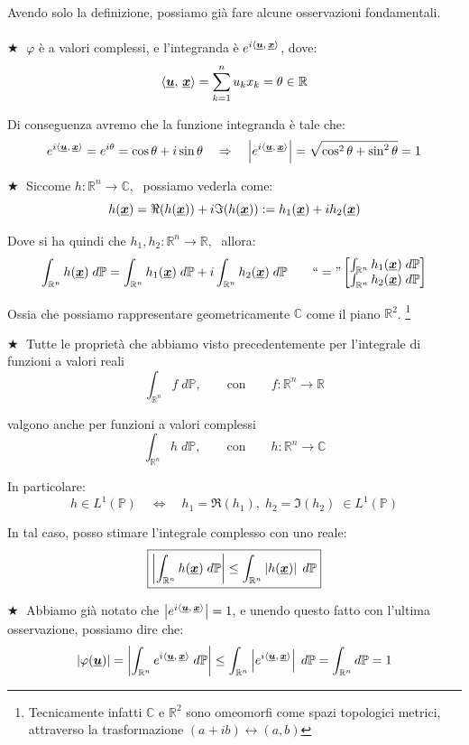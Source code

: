 \noindent Avendo solo la definizione, possiamo già fare alcune osservazioni fondamentali.\\
\\
\(\bigstar \;\) $\varphi$ è a valori complessi, e l'integranda è $e^{i\left\langle \underline{{\boldsymbol{u}}},\, \underline{{\boldsymbol{x}}} \right\rangle}$, dove:
\[\left\langle \underline{{\boldsymbol{u}}},\, \underline{{\boldsymbol{x}}} \right\rangle = \sum_{k=1}^n u_kx_k = \theta\in \mathbb{R}\]

Di conseguenza avremo che la funzione integranda è tale che:
\[e^{i\left\langle \underline{{\boldsymbol{u}}},\, \underline{{\boldsymbol{x}}} \right\rangle} = e^{i\theta} = \cos\theta+ i\sin\theta \quad \Rightarrow\quad \left|e^{i\left\langle \underline{{\boldsymbol{u}}},\, \underline{{\boldsymbol{x}}} \right\rangle}\right| = \sqrt{\cos^2\theta+ \sin^2\theta} = 1\]

\bigskip
\noindent \(\bigstar \;\) Siccome $h:\mathbb{R}^n\to\mathbb{C}, \;$ possiamo vederla come:
\[h(\underline{{\boldsymbol{x}}}) = \Re(h(\underline{{\boldsymbol{x}}}))+ i\Im(h(\underline{{\boldsymbol{x}}})):=h_1(\underline{{\boldsymbol{x}}})+ i h_2(\underline{{\boldsymbol{x}}})\]

Dove si ha quindi che $h_1, h_2:\mathbb{R}^n\to \mathbb{R}, \;$ allora:
\[\int_{\mathbb{R}^n}h(\underline{{\boldsymbol{x}}})\;d\mathbb{P} = \int_{\mathbb{R}^n}h_1(\underline{{\boldsymbol{x}}})\;d\mathbb{P}+i\int_{\mathbb{R}^n}h_2(\underline{{\boldsymbol{x}}})\;d\mathbb{P} \qquad \text{``}=\text{''} \begin{bmatrix}
    \int_{\mathbb{R}^n}h_1(\underline{{\boldsymbol{x}}})\;d\mathbb{P}\\
    \int_{\mathbb{R}^n}h_2(\underline{{\boldsymbol{x}}})\;d\mathbb{P}
\end{bmatrix}\]

Ossia che possiamo rappresentare geometricamente $\mathbb{C}$ come il piano $\mathbb{R}^2$. \footnote{Tecnicamente infatti $\mathbb{C}$ e $\mathbb{R}^2$ sono omeomorfi come spazi topologici metrici, attraverso la trasformazione $(a +ib)\leftrightarrow(a, b)$}

\bigskip
\noindent \(\bigstar \;\) Tutte le proprietà che abbiamo visto precedentemente per l'integrale di funzioni a valori reali
\[\int_{\mathbb{R}^n}f\;d\mathbb{P}, \qquad \text{con}\qquad f:\mathbb{R}^n\to \mathbb{R}\]

valgono anche per funzioni a valori complessi
\[\int_{\mathbb{R}^n}h\;d\mathbb{P}, \qquad \text{con}\qquad h:\mathbb{R}^n\to \mathbb{C}\]

In particolare:
\[h\in L^1(\mathbb{P})\quad \iff \quad h_1 = \Re(h_1), \;h_2 = \Im(h_2) \;\in L^1(\mathbb{P})\]

In tal caso, posso stimare l'integrale complesso con uno reale:
\[\boxed{\left|\int_{\mathbb{R}^n}h(\underline{{\boldsymbol{x}}})\;d\mathbb{P}\right|\leq \int_{\mathbb{R}^n}\left|h(\underline{{\boldsymbol{x}}})\right|\;d\mathbb{P}}\]

\bigskip
\noindent 
\(\bigstar \;\) Abbiamo già notato che $\left|e^{i\left\langle \underline{{\boldsymbol{u}}},\, \underline{{\boldsymbol{x}}} \right\rangle}\right|  = 1$, e unendo questo fatto con l'ultima osservazione, possiamo dire che:
\[\left|\varphi(\underline{{\boldsymbol{u}}})\right| = \left|\int_{\mathbb{R}^n} e^{i\left\langle \underline{{\boldsymbol{u}}},\, \underline{{\boldsymbol{x}}} \right\rangle}\;d\mathbb{P}\right| \leq \int_{\mathbb{R}^n}\left|e^{i\left\langle \underline{{\boldsymbol{u}}},\, \underline{{\boldsymbol{x}}} \right\rangle}\right|\;d\mathbb{P} = \int_{\mathbb{R}^n}d\mathbb{P} = 1 \]

